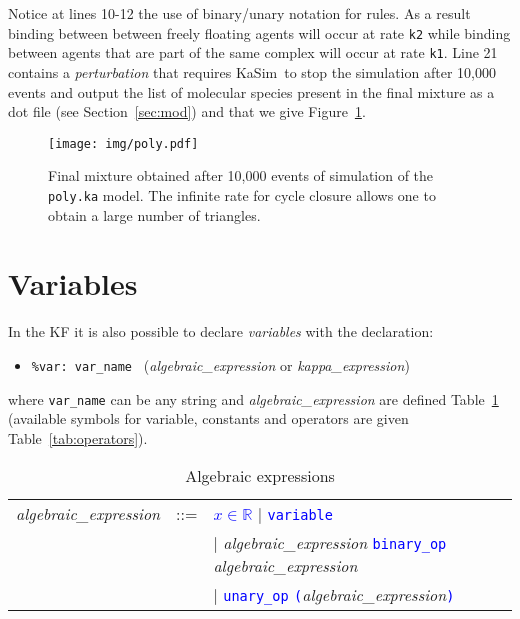 \documentclass[11pt]{book}
\def\KaSim{\textsf{KaSim}}
\def\tcb#1{\textcolor{blue}{\ttt{#1}}}
\def\ttt#1{\texttt{#1}}
\def\var#1{\textquotesingle #1\textquotesingle}
\def\ITE#1{\begin{itemize}#1\end{itemize}}
\def\Real{\mathbb R}
\begin{document}
Notice at lines 10-12 the use of binary/unary notation for rules. As a result binding between between freely floating agents will occur at rate \ttt{\textquotesingle k2\textquotesingle } while binding between agents that are part of the same complex will occur at rate \ttt{\textquotesingle k1\textquotesingle }. Line 21 contains a \emph{perturbation} that requires \KaSim~to stop the simulation after 10,000 events and output the list of molecular species present in the final mixture as a dot file (see Section~\ref{sec:mod}) and that we give Figure~\ref{fig:species}.

\begin{figure}[htbp]
\begin{center}
\texttt{[image: img/poly.pdf]}
\caption{Final mixture obtained after 10,000 events of simulation of the \ttt{poly.ka} model. The infinite rate for cycle closure allows one to obtain a large number of triangles.}
\label{fig:species}
\end{center}
\end{figure}


\section{Variables}\label{sec:var}

In the KF it is also possible to declare \emph{variables} with the declaration:
\ITE{
\item[] \ttt{\%var: \var{var\_name}~} (\textit{algebraic\_expression} or \textit{kappa\_expression})
}
where \ttt{var\_name} can be any string and \textit{algebraic\_expression} are defined Table~\ref{tab:alg} (available symbols for variable, constants and operators are given Table~\ref{tab:operators}).

\begin{table}[htbp]
  \centering
  \caption{Algebraic expressions}
  \begin{tabular}{@{} lcl @{}}
    \textit{algebraic\_expression} & ::= & \tcb{$x\in\Real$} $\mid$ \tcb{variable} \\
     &  & $\mid$ \textit{algebraic\_expression} \tcb{binary\_op} \textit{algebraic\_expression}\\
     &  & $\mid$ \tcb{unary\_op} \tcb{(}\textit{algebraic\_expression}\tcb{)} \\ 
    \end{tabular}
  \label{tab:alg}
\end{table}
\end{document}
